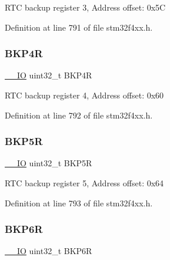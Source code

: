 R\+TC backup register 3, Address offset\+: 0x5C 

Definition at line 791 of file stm32f4xx.\+h.

\mbox{\label{struct_r_t_c___type_def_ab13e106cc2eca92d1f4022df3bfdbcd7}} 
\subsubsection{\texorpdfstring{B\+K\+P4R}{BKP4R}}
{\footnotesize\ttfamily \hyperlink{group___c_m_s_i_s__core__definitions_gaec43007d9998a0a0e01faede4133d6be}{\+\_\+\+\_\+\+IO} uint32\+\_\+t B\+K\+P4R}

R\+TC backup register 4, Address offset\+: 0x60 

Definition at line 792 of file stm32f4xx.\+h.

\mbox{\label{struct_r_t_c___type_def_ab6bed862c0d0476ff4f89f7b9bf3e130}} 
\subsubsection{\texorpdfstring{B\+K\+P5R}{BKP5R}}
{\footnotesize\ttfamily \hyperlink{group___c_m_s_i_s__core__definitions_gaec43007d9998a0a0e01faede4133d6be}{\+\_\+\+\_\+\+IO} uint32\+\_\+t B\+K\+P5R}

R\+TC backup register 5, Address offset\+: 0x64 

Definition at line 793 of file stm32f4xx.\+h.

\mbox{\label{struct_r_t_c___type_def_a1d854d2d7f0452f4c90035952b92d2ba}} 
\subsubsection{\texorpdfstring{B\+K\+P6R}{BKP6R}}
{\footnotesize\ttfamily \hyperlink{group___c_m_s_i_s__core__definitions_gaec43007d9998a0a0e01faede4133d6be}{\+\_\+\+\_\+\+IO} uint32\+\_\+t B\+K\+P6R}

